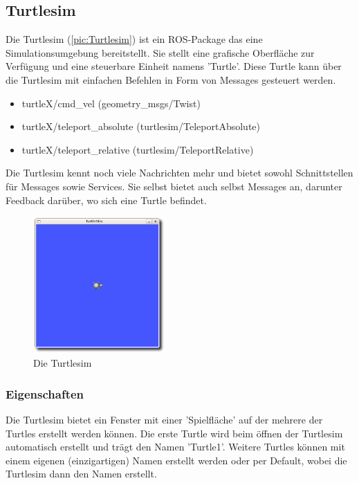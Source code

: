 \subsection*{Turtlesim}

Die Turtlesim\cite{ROS_TURTLESIM} (\autoref{pic:Turtlesim}) ist ein \ac{ROS}-Package das eine Simulationsumgebung bereitstellt. Sie stellt eine grafische Oberfläche zur Verfügung und eine steuerbare Einheit namens 'Turtle'. Diese Turtle kann über die Turtlesim mit einfachen Befehlen in Form von Messages gesteuert werden.

\begin{itemize}
\item turtleX/cmd\_vel	(geometry\_msgs/Twist)
\item turtleX/teleport\_absolute	(turtlesim/TeleportAbsolute)
\item turtleX/teleport\_relative	(turtlesim/TeleportRelative)
\end{itemize}

Die Turtlesim kennt noch viele Nachrichten mehr und bietet sowohl Schnittstellen für Messages sowie Services. Sie selbst bietet auch selbst Messages an, darunter Feedback darüber, wo sich eine Turtle befindet.

\begin{figure}[h]
	\centering
	\includegraphics[width=0.45\textwidth,keepaspectratio]{graphics/turtlesim.png}
	\caption{Die Turtlesim}
	\label{pic:Turtlesim}
\end{figure}


\subsubsection*{Eigenschaften}
Die Turtlesim bietet ein Fenster mit einer 'Spielfläche' auf der mehrere der Turtles erstellt werden können. Die erste Turtle wird beim öffnen der Turtlesim automatisch erstellt und trägt den Namen 'Turtle1'. Weitere Turtles können mit einem eigenen (einzigartigen) Namen erstellt werden oder per Default, wobei die Turtlesim dann den Namen erstellt.

